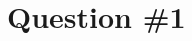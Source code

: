 \documentclass[12pt]{article}
\begin{document}
\renewcommand{\familydefault}{\rmdefault}



\pagebreak
\normalsize


\section*{Question \#1}
\end{document}
